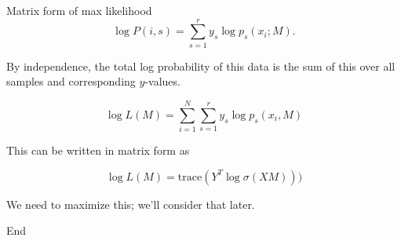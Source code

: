 \documentclass[
  ignorenonframetext,
]{beamer}
\begin{document}
\begin{frame}{Matrix form of max likelihood}
\protect\hypertarget{matrix-form-of-max-likelihood}{}
\[
\log P(i,s) = \sum_{s=1}^{r} y_{s}\log p_{s}(x_{i}; M).
\]

By independence, the total log probability of this data is the sum of
this over all samples and corresponding \(y\)-values.

\[
\log L(M) = \sum_{i=1}^{N} \sum_{s=1}^{r} y_{s}\log p_{s}(x_{i},M)
\]

This can be written in matrix form as

\[
\log L(M) = \mathrm{trace}(Y^{T}\log \sigma(XM)))
\]

We need to maximize this; we'll consider that later.
\end{frame}

\begin{frame}{End}
\protect\hypertarget{end}{}
\end{frame}
\end{document}

